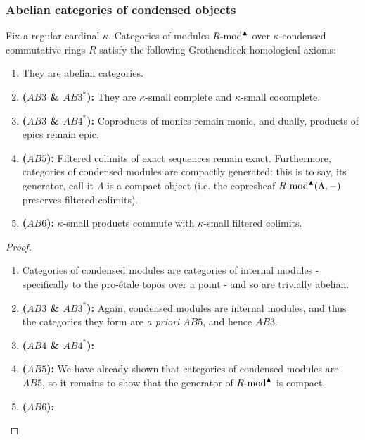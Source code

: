             \subsubsection{Abelian categories of condensed objects}
                \begin{theorem} \label{theorem: abelian_categories_of_condensed_modules}
                    Fix a regular cardinal $\kappa$. Categories of modules $R\text{-}\mathrm{mod}^{\blacktriangle}$ over $\kappa$-condensed commutative rings $R$ satisfy the following Grothendieck homological axioms:
                        \begin{enumerate}
                            \item They are abelian categories.
                            \item \textbf{($AB3$ \& $AB3^*$):} They are $\kappa$-small complete and $\kappa$-small cocomplete.
                            \item \textbf{($AB3$ \& $AB4^*$):} Coproducts of monics remain monic, and dually, products of epics remain epic.
                            \item \textbf{($AB5$):} Filtered colimits of exact sequences remain exact. Furthermore, categories of condensed modules are compactly generated: this is to say, its generator, call it $\Lambda$ is a compact object (i.e. the copresheaf $R\text{-}\mathrm{mod}^{\blacktriangle}(\Lambda, -)$ preserves filtered colimits).
                            \item \textbf{($AB6$):} $\kappa$-small products commute with $\kappa$-small filtered colimits.
                        \end{enumerate}
                \end{theorem}
                    \begin{proof}
                        \noindent
                        \begin{enumerate}
                            \item Categories of condensed modules are categories of internal modules - specifically to the pro-\'etale topos over a point - and so are trivially abelian. 
                            \item \textbf{($AB3$ \& $AB3^*$):} Again, condensed modules are internal modules, and thus the categories they form are \textit{a priori} $AB5$, and hence $AB3$.
                            \item \textbf{($AB4$ \& $AB4^*$):} 
                            \item \textbf{($AB5$):} We have already shown that categories of condensed modules are $AB5$, so it remains to show that the generator of $R\text{-}\mathrm{mod}^{\blacktriangle}$ is compact.
                            \item \textbf{($AB6$):} 
                        \end{enumerate}
                    \end{proof}
